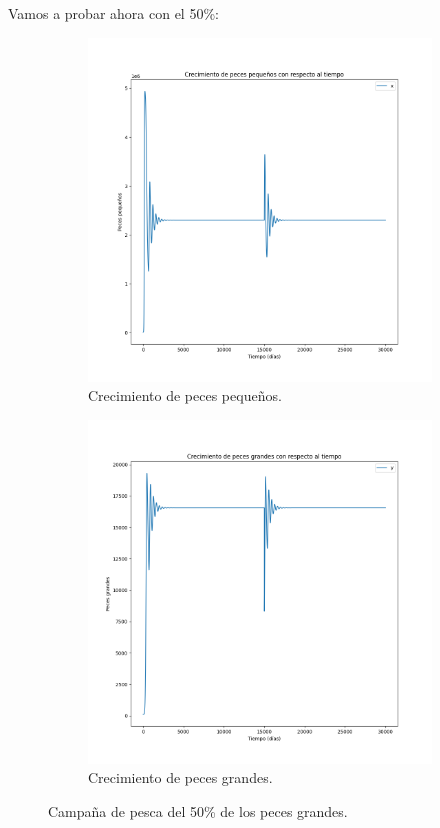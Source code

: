 \documentclass[11pt,a4paper]{report}
\begin{document}
\newpage
Vamos a probar ahora con el 50\%:
\begin{figure}[H]
  \begin{subfigure}[b]{0.49\textwidth}
    \includegraphics[width=\textwidth, height=\textwidth]{img/Cap-3/apartado-2/pequenyos_pesca_50.png}
    \caption{Crecimiento de peces pequeños.}
    \label{fig:f1}
  \end{subfigure}
  \hfill
  \begin{subfigure}[b]{0.49\textwidth}
    \includegraphics[width=\textwidth, height=\textwidth]{img/Cap-3/apartado-2/grandes_pesca_50.png}
    \caption{Crecimiento de peces grandes.}
    \label{fig:f2}
  \end{subfigure}
  \caption{Campaña de pesca del 50\% de los peces grandes.}
\end{figure}
\end{document}
